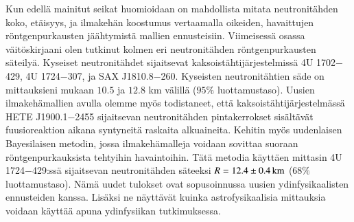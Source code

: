 \begin{otherlanguage}{finnish}
Kun edellä mainitut seikat huomioidaan on mahdollista mitata neutronitähden koko, etäisyys, ja ilmakehän koostumus vertaamalla oikeiden, havaittujen röntgenpurkausten jäähtymistä mallien ennusteisiin. 
Viimeisessä osassa väitöskirjaani olen tutkinut kolmen eri neutronitähden röntgenpurkausten säteilyä.
Kyseiset neutronitähdet sijaitsevat kaksois\-täh\-ti\-jär\-jes\-tel\-missä 4U 1702$-$429, 4U 1724$-$307, ja SAX J1810.8$-$260. 
Kyseisten neutronitähtien säde on mittauksieni mukaan $10.5$ ja $12.8$ km välillä ($95\%$ luottamustaso). 
Uusien ilmakehämallien avulla olemme myös todistaneet, että kaksois\-täh\-ti\-jär\-jes\-tel\-mässä HETE J1900.1$-$2455 sijaitsevan neutronitähden pintakerrokset sisältävät fuusioreaktion aikana syntyneitä raskaita alkuaineita. 
Kehitin myös uudenlaisen Bayesilaisen metodin, jossa ilmakehämalleja voidaan sovittaa suoraan röntgenpurkauksista tehtyihin havaintoihin. 
Tätä metodia käyttäen mittasin 4U 1724$-$429:ssä sijaitsevan neutronitähden säteeksi $R=12.4 \pm 0.4\, \mathrm{km}$ ($68\%$ luottamustaso). 
Nämä uudet tulokset ovat sopusoinnussa uusien ydinfysikaalisten ennusteiden kanssa. 
Lisäksi ne näyttävät kuinka astrofysikaalisia mittauksia voidaan käyttää apuna ydinfysiikan tutkimuksessa.

\end{otherlanguage}
